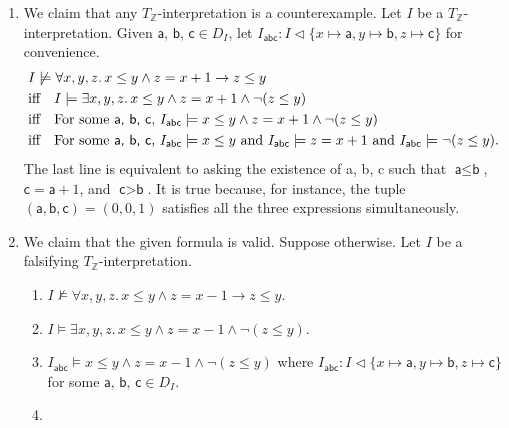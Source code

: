 \begin{exer}[3.2]
    $ $
    \begin{enumerate}[label=(\alph*)]
        \item
            We claim that any $T_{\mathbb{Z}}$-interpretation is a counterexample.
            Let $I$ be a $T_{\mathbb{Z}}$-interpretation.
            Given $\textsf{a, b, c} \in D_I$, let $I_{\textsf{abc}}: I \vartriangleleft \{ x \mapsto \textsf{a}, y \mapsto \textsf{b}, z \mapsto \textsf{c} \}$ for convenience.
            \begin{align*}
                &I \not\models \forall x, y, z.\, x \leq y \land z = x + 1 \rightarrow z \leq y \\
                &\text{iff}\quad I \models \exists x, y, z.\, x \leq y \land z = x + 1 \land \neg(z \leq y) \\
                &\text{iff}\quad \text{For some \textsf{a, b, c}, } I_{\textsf{abc}} \models x \leq y \land z = x + 1 \land \neg(z \leq y) \\
                &\text{iff}\quad \text{For some \textsf{a, b, c}, } I_{\textsf{abc}} \models x \leq y \text{ and } I_{\textsf{abc}} \models z = x + 1 \text{ and } I_{\textsf{abc}} \models \neg(z \leq y).
            \end{align*}
            The last line is equivalent to asking the existence of \textsf{a, b, c} such that $\textsf{a} \leq \textsf{b}$, $\textsf{c} = \textsf{a} + 1$, and $\textsf{c} > \textsf{b}$.
            It is true because, for instance, the tuple $(\textsf{a}, \textsf{b}, \textsf{c}) = (0, 0, 1)$ satisfies all the three expressions simultaneously.
        \item
            We claim that the given formula is valid.
            Suppose otherwise.
            Let $I$ be a falsifying $T_{\mathbb{Z}}$-interpretation.
            \begin{enumerate}[label=\arabic*.]
                \item
                    $I \not\models \forall x, y, z.\, x \leq y \land z = x - 1 \rightarrow z \leq y$.
                \item
                    $I \models \exists x, y, z.\, x \leq y \land z = x - 1 \land \neg(z \leq y)$.
                \item
                    $I_{\textsf{abc}} \models x \leq y \land z = x - 1 \land \neg(z \leq y)$ where $I_{\textsf{abc}}: I \vartriangleleft \{ x \mapsto \textsf{a}, y \mapsto \textsf{b}, z \mapsto \textsf{c} \}$ for some $\textsf{a, b, c} \in D_I$.
                \item

\end{enumerate}
\end{enumerate}
\end{exer}
